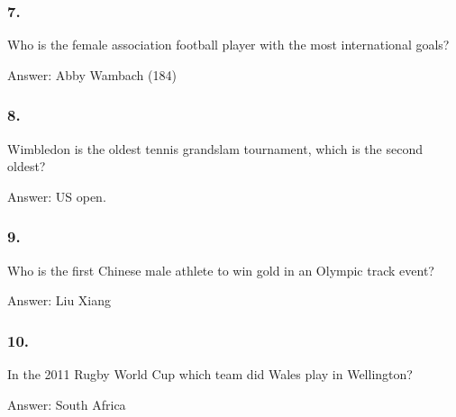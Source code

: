 \documentclass{beamer}
\begin{document}
    \begin{frame}
        \frametitle{7.}
        Who is the female association football player with the most
        international goals?\\

        \begin{center}
            Answer: Abby Wambach (184)
        \end{center}
    \end{frame}

    \begin{frame}
        \frametitle{8.}
        Wimbledon is the oldest tennis grandslam tournament, which is the
        second oldest?\\

        \begin{center}
            Answer: US open.
        \end{center}
    \end{frame}

    \begin{frame}
        \frametitle{9.}
        Who is the first Chinese male athlete to win gold in an Olympic track
        event?\\

        \begin{center}
            Answer: Liu Xiang
        \end{center}
    \end{frame}

    \begin{frame}
        \frametitle{10.}
        In the 2011 Rugby World Cup which team did Wales play in Wellington?\\

        \begin{center}
            Answer: South Africa
        \end{center}
    \end{frame}
\end{document}
